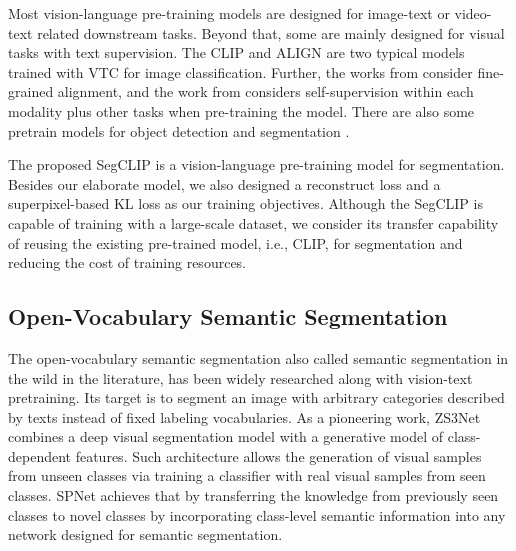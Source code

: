 \documentclass{article}
\theoremstyle{plain}
\theoremstyle{definition}
\theoremstyle{remark}
\begin{document}
Most vision-language pre-training models are designed for image-text or video-text related downstream tasks. Beyond that, some are mainly designed for visual tasks with text supervision. The CLIP \cite{Radford2021Learning} and ALIGN \cite{Jia2021Scaling} are two typical models trained with VTC for image classification. Further, the works from \cite{Yao2022FILIP, Zeng2022Multi} consider fine-grained alignment, and the work from \cite{Li2022Supervision} considers self-supervision within each modality plus other tasks when pre-training the model. There are also some pretrain models for object detection \cite{Gu2021Open, Zhong2022RegionCLIP, Li2022Grounded} and segmentation \cite{Wu2020PhraseCut, Ghiasi2021Scaling, Lueddecke2022Image, Rao2022DenseCLIP, Ding2022Open}.

The proposed SegCLIP is a vision-language pre-training model for segmentation. Besides our elaborate model, we also designed a reconstruct loss and a superpixel-based KL loss as our training objectives. Although the SegCLIP is capable of training with a large-scale dataset, we consider its transfer capability of reusing the existing pre-trained model, i.e., CLIP, for segmentation and reducing the cost of training resources. 

\subsection{Open-Vocabulary Semantic Segmentation}
The open-vocabulary semantic segmentation also called semantic segmentation in the wild in the literature, has been widely researched along with vision-text pretraining. Its target is to segment an image with arbitrary categories described by texts instead of fixed labeling vocabularies. 
As a pioneering work, ZS3Net \cite{Bucher2019Zero} combines a deep visual segmentation model with a generative model of class-dependent features. Such architecture allows the generation of visual samples from unseen classes via training a classifier with real visual samples from seen classes.
SPNet \cite{Xian2019Semantic} achieves that by transferring the knowledge from previously seen classes to novel classes by incorporating class-level semantic information into any network designed for semantic segmentation.
\end{document}
